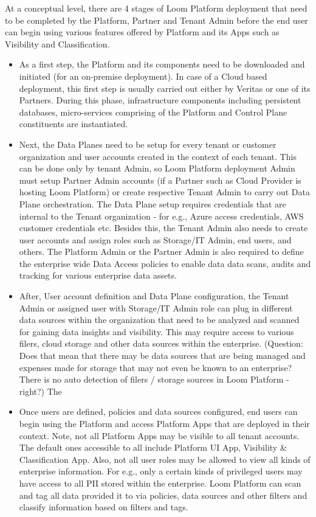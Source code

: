 \documentclass[letterpaper,10pt,english]{sphinxmanual}
\begin{document}
At a conceptual level, there are 4 stages of Loom Platform deployment that need to be completed by the Platform, Partner and Tenant Admin before the end user can begin using various features offered by Platform and its Apps such as Visibility and Classification.
\begin{itemize}
\item {} 
 As a first step, the Platform and its components need to be downloaded and initiated (for an on-premise deployment). In case of a Cloud based deployment, this first step is usually carried out either by Veritas or one of its Partners. During this phase, infrastructure components including persistent databases, micro-services comprising of the Platform and Control Plane constituents are instantiated.

\item {} 
 Next, the Data Planes need to be setup for every tenant or customer organization and user accounts created in the context of each tenant.  This can be done only by tenant Admin, so Loom Platform deployment Admin must setup Partner Admin accounts (if a Partner such as Cloud Provider is hosting Loom Platform) or create respective Tenant Admin to carry out Data Plane orchestration. The Data Plane setup requires credentials that are internal to the Tenant organization - for e.g., Azure access credentials, AWS customer credentials etc. Besides this, the Tenant Admin also needs to create user accounts and assign roles such as Storage/IT Admin, end users, and others. The Platform Admin or the Partner Admin is also required to define the enterprise wide Data Access policies to enable data data scans, audits and tracking for various enterprise data assets.

\item {} 
 After, User account definition and Data Plane configuration, the Tenant Admin or assigned user with Storage/IT Admin role can plug in different data sources within the organization that need to be analyzed and scanned for gaining data insights and visibility. This may require access to various filers, cloud storage and other data sources within the enterprise. (Question:  Does that mean that there may be  data sources that are being managed and expenses made for storage that may not even be known to an enterprise? There is no auto detection of filers / storage sources in Loom Platform - right?) The

\item {} 
 Once users are defined, policies and data sources configured, end users can begin using the Platform and access Platform Apps that are deployed in their context.  Note, not all Platform Apps may be visible to all tenant accounts.  The default ones accessible to all include Platform UI App, Visibility \& Classification App. Also, not all user roles may be allowed to view all kinds of enterprise information. For e.g., only a certain kinds of privileged users may have access to all PII stored within the enterprise.  Loom Platform can scan and tag all data provided it to via policies, data sources and other filters and classify information based on filters and tags.


\end{itemize}
\end{document}
